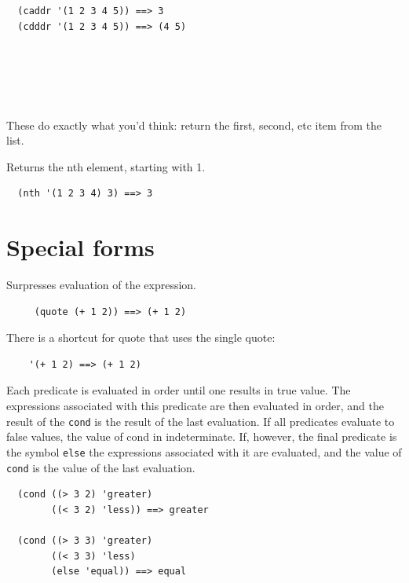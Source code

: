 \documentclass[12pt]{article}
\begin{document}
\begin{verbatim}
  (caddr '(1 2 3 4 5)) ==> 3
  (cdddr '(1 2 3 4 5)) ==> (4 5)
\end{verbatim}

\\
\\
\\
\\

These do exactly what you'd think: return the first, second, etc item
from the list.


Returns the nth element, starting with 1.

\begin{verbatim}
  (nth '(1 2 3 4) 3) ==> 3
\end{verbatim}

\section{Special forms}


Surpresses evaluation of the expression.

\begin{verbatim}
     (quote (+ 1 2)) ==> (+ 1 2)
\end{verbatim}

There is a shortcut for quote that uses the single quote:

\begin{verbatim}
    '(+ 1 2) ==> (+ 1 2)
\end{verbatim}


Each predicate is evaluated in order until one results in true value.
The expressions associated with this predicate are then evaluated in order,
and the result of the \verb|cond| is the result of the last
evaluation. If all predicates evaluate to false values, the value of
cond in indeterminate. If, however, the final predicate is the symbol
\verb|else| the expressions associated with it are evaluated, and the
value of \verb|cond| is the value of the last evaluation.

\begin{verbatim}
  (cond ((> 3 2) 'greater)
        ((< 3 2) 'less)) ==> greater

  (cond ((> 3 3) 'greater)
        ((< 3 3) 'less)
        (else 'equal)) ==> equal
\end{verbatim}
\end{document}
